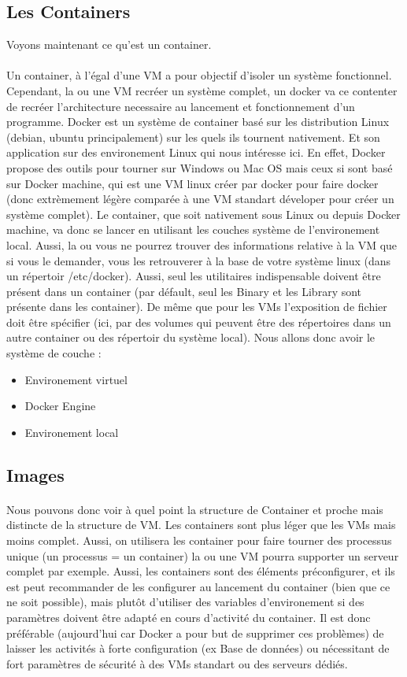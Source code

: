 \documentclass[a4paper,11pt]{article}
\begin{document}
\subsection{Les Containers}
Voyons maintenant ce qu'est un container.
\paragraph*{}
Un container, à l'égal d'une VM a pour objectif d'isoler un système fonctionnel. Cependant, la ou une VM recréer un système complet, un docker va ce contenter de recréer l'architecture necessaire au lancement et fonctionnement d'un programme. Docker est un système de container basé sur les distribution Linux (debian, ubuntu principalement) sur les quels ils tournent nativement. Et son application sur des environement Linux qui nous intéresse ici. En effet, Docker propose des outils pour tourner sur Windows ou Mac OS mais ceux si sont basé sur Docker machine, qui est une VM linux créer par docker pour faire docker (donc extrèmement légère comparée à une VM standart déveloper pour créer un système complet). Le container, que soit nativement sous Linux ou depuis Docker machine, va donc se lancer en utilisant les couches système de l'environement local. Aussi, la ou vous ne pourrez trouver des informations relative à la VM que si vous le demander, vous les retrouverer à la base de votre système linux (dans un répertoir /etc/docker). 
Aussi, seul les utilitaires indispensable doivent être présent dans un container (par défault, seul les Binary et les Library sont présente dans les container). De même que pour les VMs l'exposition de fichier doit être spécifier (ici, par des volumes qui peuvent être des répertoires dans un autre container ou des répertoir du système local). Nous allons donc avoir le système de couche :
\begin{itemize}
 \item Environement virtuel
 \item Docker Engine
 \item Environement local
\end{itemize}
\subsection{Images}
\paragraph*{}
Nous pouvons donc voir à quel point la structure de Container et proche mais distincte de la structure de VM. Les containers sont plus léger que les VMs mais moins complet. Aussi, on utilisera les container pour faire tourner des processus unique (un processus = un container) la ou une VM pourra supporter un serveur complet par exemple. Aussi, les containers sont des éléments préconfigurer, et ils est peut recommander de les configurer au lancement du container (bien que ce ne soit possible), mais plutôt d'utiliser des variables d'environement si des paramètres doivent être adapté en cours d'activité du container. Il est donc préférable (aujourd'hui car Docker a pour but de supprimer ces problèmes) de laisser les activités à forte configuration (ex Base de données) ou nécessitant de fort paramètres de sécurité à des VMs standart ou des serveurs dédiés.
\end{document}
